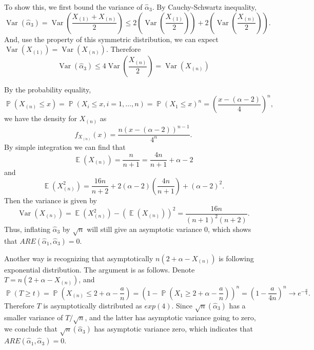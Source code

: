 \documentclass[12pt]{article}
\newcommand{\1}{\mathbbm{1}}
\newcommand{\E}{\operatorname{\mathbb{E}}}
\renewcommand{\P}{\operatorname{\mathbb{P}}}
\newcommand{\var}[1]{\operatorname{Var}\left(#1\right)}
\begin{document}
To show this, we first bound the variance of $\hat{\alpha}_3$. By Cauchy-Schwartz inequality,
$$
\var{\hat{\alpha}_3} = \var{\frac{X_{(1)} + X_{(n)}}{2}} \leq 2(\var{\frac{X_{(1)}}{2}}) + 2(\var{\frac{X_{(n)}}{2}}).
$$
And, use the property of this symmetric distribution, we can expect $\var{X_{(1)}} = \var{X_{(n)}}$. Therefore 
$$
\var{\hat{\alpha}_3} \leq 4\var{\frac{X_{(n)}}{2}} = \var{X_{(n)}}
$$

By the probability equality,
$$
\P (X_{(n)} \leq x) = \P (X_i \leq x, i=1,\ldots,n ) = \P(X_1 \leq x)^n = (\frac{x - (\alpha-2)}{4})^n,
$$
we have the density for $X_{(n)}$ as
$$
f_{X_{(n)}} (x) = \frac{n(x - (\alpha-2))^{n-1}}{4^n}.
$$
By simple integration we can find that
$$
\E (X_{(n)}) = \frac{n}{n+1} = \frac{4n}{n+1} + \alpha -2
$$
and 
$$
\E (X_{(n)}^2) = \frac{16n}{n+2} + 2(\alpha -2) ( \frac{4n}{n+1} ) + (\alpha-2)^2.
$$
Then the variance is given by
$$
\var{X_{(n)}} = \E (X_{(n)}^2) - (\E (X_{(n)}))^2 = \frac{16n}{(n+1)^2(n+2)}.
$$
Thus, inflating $\hat{\alpha}_3$ by $\sqrt n$ will still give an asymptotic variance $0$, which shows that $ARE(\hat{\alpha}_1,\hat{\alpha}_3) = 0$.

Another way is recognizing that asymptotically $n( 2+\alpha - X_{(n)})$ is following exponential distribution. The argument is as follows. Denote $T =  n( 2+\alpha - X_{(n)})$, and
$$
\P (T \geq t ) = \P (X_{(n)} \leq 2+\alpha- \frac{a}{n} ) = (1 - \P (X_1 \geq 2+\alpha- \frac{a}{n} ))^n = (1 - \frac{a}{4n})^n \rightarrow e^{-\frac{a}{4}}.
$$
Therefore $T$ is asymptotically distributed as $exp(4)$. Since $\sqrt{n}(\hat{\alpha}_3)$ has a smaller variance of $T /\sqrt{n}$, and the latter has asymptotic variance going to zero, we conclude that $\sqrt{n}(\hat{\alpha}_3)$ has asymptotic variance zero, which indicates that $ARE(\hat{\alpha}_1,\hat{\alpha}_3) = 0$.

\end{document}
